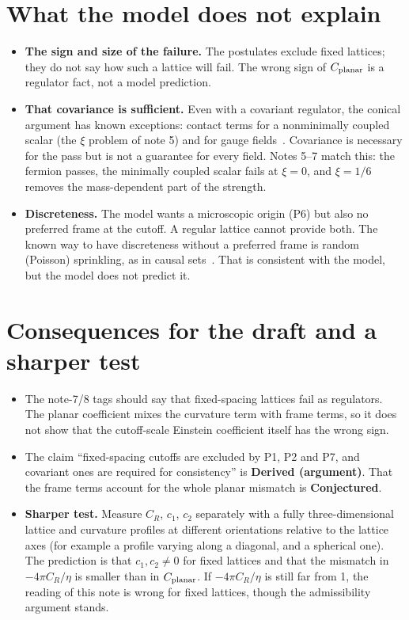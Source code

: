 \documentclass[11pt]{article}
\begin{document}
\section{What the model does not explain}
\begin{itemize}
\item \textbf{The sign and size of the failure.} The postulates exclude fixed lattices; they do not say how such a lattice will fail. The wrong sign of $C_{\rm planar}$ is a regulator fact, not a model prediction.
\item \textbf{That covariance is sufficient.} Even with a covariant regulator, the conical argument has known exceptions: contact terms for a nonminimally coupled scalar (the $\xi$ problem of note 5) and for gauge fields~\cite{Kabat}. Covariance is necessary for the pass but is not a guarantee for every field. Notes 5--7 match this: the fermion passes, the minimally coupled scalar fails at $\xi=0$, and $\xi=1/6$ removes the mass-dependent part of the strength.
\item \textbf{Discreteness.} The model wants a microscopic origin (P6) but also no preferred frame at the cutoff. A regular lattice cannot provide both. The known way to have discreteness without a preferred frame is random (Poisson) sprinkling, as in causal sets~\cite{BHS}. That is consistent with the model, but the model does not predict it.
\end{itemize}

\section{Consequences for the draft and a sharper test}
\begin{itemize}
\item The note-7/8 tags should say that fixed-spacing lattices fail as regulators. The planar coefficient mixes the curvature term with frame terms, so it does not show that the cutoff-scale Einstein coefficient itself has the wrong sign.
\item The claim ``fixed-spacing cutoffs are excluded by P1, P2 and P7, and covariant ones are required for consistency'' is \textbf{Derived (argument)}. That the frame terms account for the whole planar mismatch is \textbf{Conjectured}.
\item \textbf{Sharper test.} Measure $C_R$, $c_1$, $c_2$ separately with a fully three-dimensional lattice and curvature profiles at different orientations relative to the lattice axes (for example a profile varying along a diagonal, and a spherical one). The prediction is that $c_1,c_2\neq0$ for fixed lattices and that the mismatch in $-4\pi C_R/\eta$ is smaller than in $C_{\rm planar}$. If $-4\pi C_R/\eta$ is still far from 1, the reading of this note is wrong for fixed lattices, though the admissibility argument stands.
\end{itemize}
\end{document}
